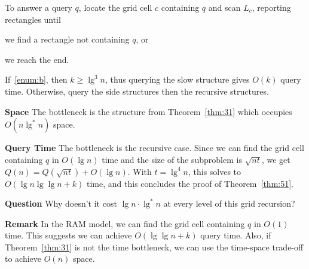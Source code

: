 \documentclass[letterpaper,12pt,twocolumn]{article}
\newcommand{\BigOh}[1]{O\!\left(#1\right)}
\theoremstyle{plain}
\begin{document}
To answer a query $q$, locate the grid cell $c$ containing $q$ and
scan $L_c$, reporting rectangles until
%
\begin{enumerate*}[label=(\alph*)] %
\item\label{enum:a} we find a rectangle not containing $q$, or
\item\label{enum:b} we reach the end.
\end{enumerate*}

If~\ref{enum:b}, then $k \ge \lg^3 n$, thus querying the slow
structure gives $\BigOh{k}$ query time.  Otherwise, query the side
structures then the recursive structures.

\textbf{Space} The bottleneck is the structure from
Theorem~\ref{thm:31} which occupies $\BigOh{n\lg^* n}$ space.

\textbf{Query Time} The bottleneck is the recursive case.  Since we
can find the grid cell containing $q$ in $\BigOh{\lg n}$ time and the
size of the subproblem is $\sqrt{nt}$, we get $Q(n) = Q(\sqrt{nt}) +
\BigOh{\lg n}$.  With $t = \lg^4n$, this solves to $\BigOh{\lg n\lg\lg
  n + k}$ time, and this concludes the proof of Theorem~\ref{thm:51}.

\textbf{Question} Why doesn't it cost $\lg n\cdot\lg^* n$ at every
level of this grid recursion?

\textbf{Remark} In the RAM model, we can find the grid cell containing
$q$ in $\BigOh{1}$ time.  This suggests we can achieve $\BigOh{\lg\lg
  n + k}$ query time.  Also, if Theorem~\ref{thm:31} is not the time
bottleneck, we can use the time-space trade-off to achieve $\BigOh{n}$
space.
\end{document}
